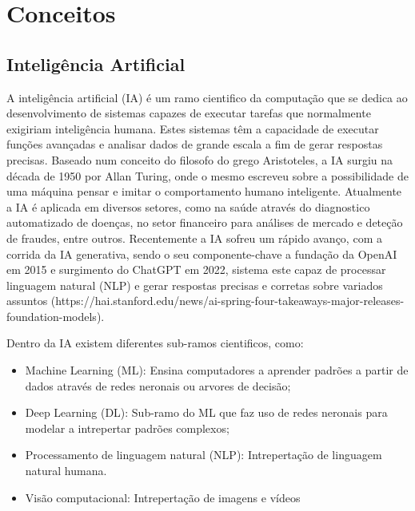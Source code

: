
\chapter{Conceitos} %



\section{Inteligência Artificial}

A inteligência artificial (IA) é um ramo cientifico da computação que se dedica ao desenvolvimento de sistemas capazes de executar tarefas que normalmente exigiriam inteligência humana.
Estes sistemas têm a capacidade de executar funções avançadas e analisar dados de grande escala a fim de gerar respostas precisas.  Baseado num conceito do filosofo do grego Aristoteles, a IA surgiu na década de 1950 por Allan Turing, onde o mesmo escreveu sobre a possibilidade de uma máquina pensar e imitar o comportamento humano inteligente. 
Atualmente a IA é aplicada em diversos setores, como na saúde através do diagnostico automatizado de doenças, no setor financeiro para análises de mercado e deteção de fraudes, entre outros. Recentemente a IA sofreu um rápido avanço, com a corrida da IA generativa, sendo o seu componente-chave a fundação da OpenAI em 2015 e surgimento do ChatGPT em 2022, sistema este capaz de processar linguagem natural (NLP) e gerar respostas precisas e corretas sobre variados assuntos (https://hai.stanford.edu/news/ai-spring-four-takeaways-major-releases-foundation-models).

Dentro da IA existem diferentes sub-ramos cientificos, como:

\begin{itemize}
    \item Machine Learning (ML): Ensina computadores a aprender padrões a partir de dados através de redes neronais ou arvores de decisão;
    \item Deep Learning (DL): Sub-ramo do ML que faz uso de redes neronais para modelar a intrepertar padrões complexos;
    \item Processamento de linguagem natural (NLP): Intrepertação de linguagem natural humana.
    \item Visão computacional: Intrepertação de imagens e vídeos
\end{itemize}



